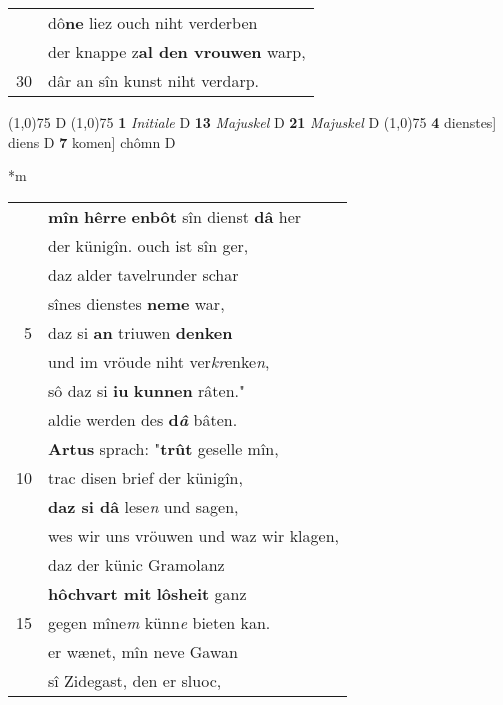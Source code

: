 \documentclass[8pt,a4paper,notitlepage]{article}
\begin{document}
\begin{table}[ht]
\begin{minipage}[t]{0.5\linewidth}
\begin{tabular}{rl}
 & dô\textbf{ne} liez ouch niht verderben\\ 
 & der knappe z\textbf{al den vrouwen} warp,\\ 
30 & dâr an sîn kunst niht verdarp.\\ 
\end{tabular}
\scriptsize
\line(1,0){75} \newline
D \newline
\line(1,0){75} \newline
\textbf{1} \textit{Initiale} D  \textbf{13} \textit{Majuskel} D  \textbf{21} \textit{Majuskel} D  \newline
\line(1,0){75} \newline
\textbf{4} dienstes] diens D \textbf{7} komen] chômn D \newline
\end{minipage}
\hspace{0.5cm}
\begin{minipage}[t]{0.5\linewidth}
\small
\begin{center}*m
\end{center}
\begin{tabular}{rl}
 & \textbf{mîn} \textbf{hêrre} \textbf{enbôt} sîn dienst \textbf{dâ} her\\ 
 & der künigîn. ouch ist sîn ger,\\ 
 & daz alder tavelrunder schar\\ 
 & sînes dienstes \textbf{neme} war,\\ 
5 & daz si \textbf{an} triuwen \textbf{denken}\\ 
 & und im vröude niht ver\textit{kr}enke\textit{n},\\ 
 & sô daz si \textbf{iu} \textbf{kunnen} râten."\\ 
 & aldie werden des \textbf{d\textit{â}} bâten.\\ 
 & \textbf{Artus} sprach: "\textbf{trût} geselle mîn,\\ 
10 & trac disen brief der künigîn,\\ 
 & \textbf{daz si dâ} lese\textit{n} und sagen,\\ 
 & wes wir uns vröuwen und waz wir klagen,\\ 
 & daz der künic Gramolanz\\ 
 & \textbf{hôchvart mit} \textbf{lôsheit} ganz\\ 
15 & gegen mîne\textit{m} künn\textit{e} bieten kan.\\ 
 & er wænet, mîn neve Gawan\\ 
 & sî Zidegast, den er sluoc,\\ 

\end{tabular}
\end{minipage}
\end{table}
\end{document}
